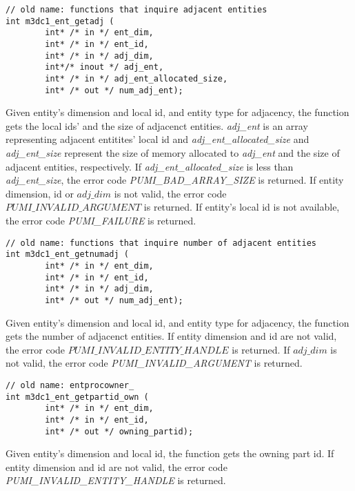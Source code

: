 \begin{verbatim}
// old name: functions that inquire adjacent entities
int m3dc1_ent_getadj (
        int* /* in */ ent_dim, 
        int* /* in */ ent_id, 
        int* /* in */ adj_dim,
        int*/* inout */ adj_ent,
        int* /* in */ adj_ent_allocated_size,
        int* /* out */ num_adj_ent); 
\end{verbatim}\vspace{-.5cm}\hspace{1cm}

Given entity's dimension and local id, and entity type for adjacency, the function gets the local ids' and the size of adjacenct entities. \emph{adj\_ent} is an array representing adjacent entitites' local id and \emph{adj\_ent\_allocated\_size} and \emph{adj\_ent\_size} represent the size of memory allocated to \emph{adj\_ent} and the size of adjacent entities, respectively. If \emph{adj\_ent\_allocated\_size} is less than \emph{adj\_ent\_size}, the error code \emph{PUMI\_BAD\_ARRAY\_SIZE} is returned. If entity dimension, id or $adj\_dim$ is not valid, the error code $PUMI\_INVALID\_ARGUMENT$ is returned. If entity's local id is not available, the error code \emph{PUMI\_FAILURE} is returned.
	      
\begin{verbatim}
// old name: functions that inquire number of adjacent entities
int m3dc1_ent_getnumadj (
        int* /* in */ ent_dim, 
        int* /* in */ ent_id, 
        int* /* in */ adj_dim,
        int* /* out */ num_adj_ent);
\end{verbatim}\vspace{-.5cm}\hspace{1cm}

Given entity's dimension and local id, and entity type for adjacency, the function gets the number of adjacenct entities. If entity dimension and id are not valid, the error code $PUMI\_INVALID\_ENTITY\_HANDLE$ is returned. If $adj\_dim$ is not valid, the error code \emph{PUMI\_INVALID\_ARGUMENT} is returned. 


\begin{verbatim}
// old name: entprocowner_
int m3dc1_ent_getpartid_own (
        int* /* in */ ent_dim, 
        int* /* in */ ent_id, 
        int* /* out */ owning_partid); 
\end{verbatim}\vspace{-.5cm}\hspace{1cm}

Given entity's dimension and local id, the function gets the owning part id. If entity dimension and id are not valid, the error code \emph{PUMI\_INVALID\_ENTITY\_HANDLE} is returned.


